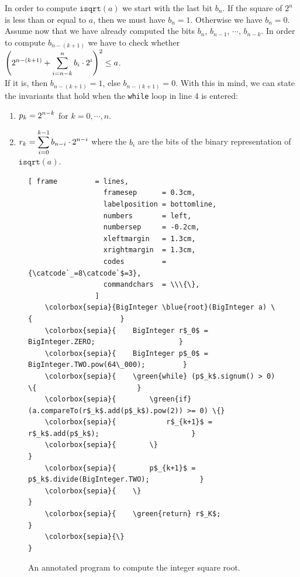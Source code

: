 In order to compute $\mathtt{isqrt}(a)$ we start with the last bit $b_{n}$.  If the square of $2^{n}$ is
less than or equal to $a$, then we must have $b_{n} = 1$.  Otherwise we have $b_{n} = 0$.  Assume now that
we have already computed the bits $b_{n}$, $b_{n-1}$, $\cdots$, $b_{n-k}$.  In order to compute $b_{n-(k+1)}$
we have to check whether 
\\[0.2cm]
\hspace*{1.3cm}
$\displaystyle\left(\displaystyle 2^{n-(k+1)} + \sum\limits_{i=n-k}^{n} b_i \cdot 2^i \right)^2 \leq a$.
\\[0.2cm]
If it is, then  $b_{n-(k+1)} = 1$, else $b_{n-(k+1)} = 0$.
With this in mind, we can state the invariants that hold when the \texttt{while} loop in line 4 is entered:
\begin{enumerate}
\item $\displaystyle p_k = 2^{n - k}$ \quad for $k=0,\cdots,n$.
\item $\displaystyle r_k = \sum\limits_{i=0}^{k-1} b_{n-i} \cdot 2^{n-i}$ \quad where the $b_i$ are the bits of the
       binary representation of $\mathtt{isqrt}(a)$.
\end{enumerate}

\begin{figure}[!h]
\centering
\begin{Verbatim}[ frame         = lines, 
                  framesep      = 0.3cm, 
                  labelposition = bottomline,
                  numbers       = left,
                  numbersep     = -0.2cm,
                  xleftmargin   = 1.3cm,
                  xrightmargin  = 1.3cm,
                  codes         = {\catcode`_=8\catcode`$=3},
                  commandchars  = \\\{\},
                ]
    \colorbox{sepia}{BigInteger \blue{root}(BigInteger a) \{                     }
    \colorbox{sepia}{    BigInteger r$_0$ = BigInteger.ZERO;                    }
    \colorbox{sepia}{    BigInteger p$_0$ = BigInteger.TWO.pow(64\_000);         }
    \colorbox{sepia}{    \green{while} (p$_k$.signum() > 0) \{                        }
    \colorbox{sepia}{        \green{if} (a.compareTo(r$_k$.add(p$_k$).pow(2)) >= 0) \{}
    \colorbox{sepia}{            r$_{k+1}$ = r$_k$.add(p$_k$);                      }
    \colorbox{sepia}{        \}                                          }
    \colorbox{sepia}{        p$_{k+1}$ = p$_k$.divide(BigInteger.TWO);            }
    \colorbox{sepia}{    \}                                              }
    \colorbox{sepia}{    \green{return} r$_K$;                                     }
    \colorbox{sepia}{\}                                                  }
\end{Verbatim}
\vspace*{-0.3cm}
\caption{An annotated program to compute the integer square root.}
\label{fig:Integer-Square-Root-Iterative.ipynb}
\end{figure} %


